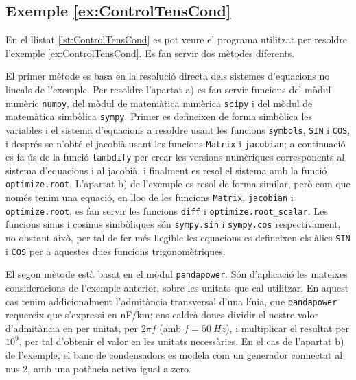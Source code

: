 \hypertarget{exemple:ControlTensCond}{\subsection{Exemple \ref*{ex:ControlTensCond} \ControlTensCond}}
En el llistat \vref{lst:ControlTensCond} es pot veure el programa utilitzat per resoldre l'exemple \vref{ex:ControlTensCond}. Es fan servir dos mètodes diferents.

El primer mètode es basa en la resolució directa dels sistemes d'equacions no lineals de l'exemple. Per resoldre l'apartat a)   es fan servir funcions del mòdul numèric \texttt{numpy}, del mòdul de matemàtica numèrica \texttt{scipy} i del mòdul de matemàtica simbòlica \texttt{sympy}. Primer es defineixen de forma simbòlica les variables i el sistema d'equacions a resoldre usant les funcions \texttt{symbols}, \texttt{SIN} i \texttt{COS}, i després se n'obté el jacobià usant les funcions \texttt{Matrix} i \texttt{jacobian}; a continuació es fa ús de la funció  \texttt{lambdify} per crear les versions numèriques corresponents al sistema d'equacions i al jacobià, i finalment es resol el sistema amb la funció \texttt{optimize.root}. L'apartat b) de l'exemple es resol de forma similar, però com que només tenim una equació, en lloc de les funcions \texttt{Matrix}, \texttt{jacobian} i \texttt{optimize.root}, es fan servir les funcions \texttt{diff} i \texttt{optimize.root\_scalar}. Les funcions sinus i cosinus simbòliques són  \texttt{sympy.sin} i  \texttt{sympy.cos} respectivament, no obstant això,  per tal de fer més llegible les equacions es defineixen els àlies \texttt{SIN} i \texttt{COS} per a aquestes dues funcions trigonomètriques.

El segon mètode està basat en el mòdul \texttt{pandapower}. Són d'aplicació les mateixes consideracions de l'exemple anterior, sobre les unitats que cal utilitzar. En aquest cas tenim addicionalment l'admitància transversal d'una línia, que \texttt{pandapower} requereix que s'expressi en \unit{nF/km}; ens caldrà doncs dividir el nostre valor d'admitància en per unitat, per $2 \pi f$ (amb $f = \qty{50}{Hz}$), i multiplicar el resultat per $10^9$, per tal d'obtenir el valor en les unitats necessàries. En el cas de l'apartat  b) de l'exemple, el banc de condensadors es modela com un generador connectat al nus 2, amb una potència activa  igual a zero.




